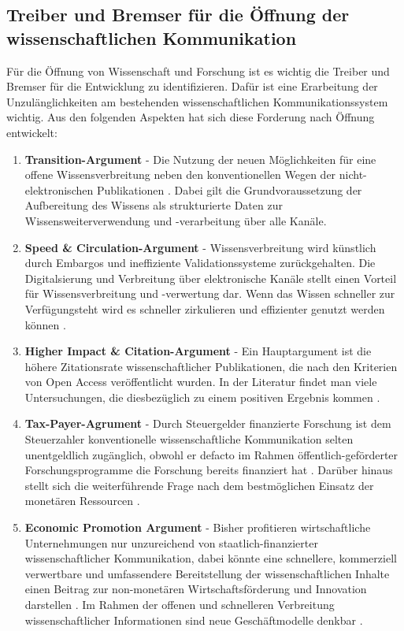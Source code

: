 \subsection{Treiber und Bremser für die Öffnung der wissenschaftlichen Kommunikation} 
Für die Öffnung von Wissenschaft und Forschung ist es wichtig die Treiber und Bremser für die Entwicklung zu identifizieren. Dafür ist eine Erarbeitung der Unzulänglichkeiten am bestehenden wissenschaftlichen Kommunikationssystem wichtig\cite{cite:17}. Aus den folgenden Aspekten hat sich diese Forderung nach Öffnung entwickelt:
\begin{enumerate}
\item \textbf{Transition-Argument} - Die Nutzung der neuen Möglichkeiten für eine offene Wissensverbreitung neben den konventionellen Wegen der nicht-elektronischen Publikationen \cite{berliner_erklaerung_2003}. Dabei gilt die Grundvoraussetzung der Aufbereitung des Wissens als strukturierte Daten zur Wissensweiterverwendung und -verarbeitung über alle Kanäle.
\item \textbf{Speed & Circulation-Argument} - Wissensverbreitung wird künstlich durch Embargos und ineffiziente Validationssysteme zurückgehalten. Die Digitalsierung und Verbreitung über elektronische Kanäle stellt einen Vorteil für Wissensverbreitung und -verwertung dar. Wenn das Wissen schneller zur Verfügungsteht wird es schneller zirkulieren und effizienter genutzt werden können \cite{Woelfle_2011}.  
\item \textbf{Higher Impact & Citation-Argument} - Ein Hauptargument ist die höhere Zitationsrate wissenschaftlicher Publikationen, die nach den Kriterien von Open Access veröffentlicht wurden\cite{cite:21a}. In der Literatur findet man viele Untersuchungen, die diesbezüglich zu einem positiven Ergebnis kommen \cite{Lawrence_2001} \cite{Jeffrey_2008} \cite{Eysenbach_2006} \cite{Antelman_2004}.
\item \textbf{Tax-Payer-Agrument} - Durch Steuergelder finanzierte Forschung ist dem Steuerzahler konventionelle wissenschaftliche Kommunikation selten unentgeldlich zugänglich, obwohl er defacto im Rahmen öffentlich-geförderter Forschungsprogramme die Forschung bereits finanziert hat \cite{suber_2003_taxpayer} \cite{Adema_2014_open_access}. Darüber hinaus stellt sich die weiterführende Frage nach dem bestmöglichen Einsatz der monetären Ressourcen \cite{Glasziou_2014} \cite{altman_1994_scandal}.
\item \textbf{Economic Promotion Argument} - Bisher profitieren wirtschaftliche Unternehmungen nur unzureichend von staatlich-finanzierter wissenschaftlicher Kommunikation, dabei könnte eine schnellere, kommerziell verwertbare und umfassendere Bereitstellung der wissenschaftlichen Inhalte einen Beitrag zur non-monetären Wirtschaftsförderung und Innovation darstellen \cite{heise_2012}. Im Rahmen der offenen und schnelleren Verbreitung wissenschaftlicher Informationen sind neue Geschäftmodelle denkbar \cite{suchen}.

\end{enumerate}
